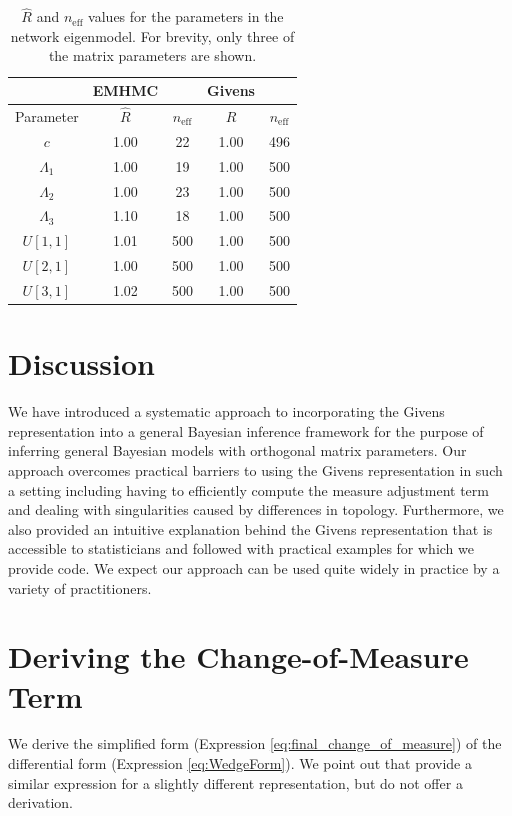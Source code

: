 \documentclass[ba]{imsart}
\numberwithin{equation}{section}
\theoremstyle{plain}
\begin{document}
\begin{table}
\begin{tabular}{|c||cc|cc|}
\hline
 & EMHMC & & Givens &\\
\hline
Parameter & $\hat{R}$ & $n_{\mathrm{eff}}$ & $\hat{R}$ & $n_{\mathrm{eff}}$\\
\hline
\hline
$c$ & 1.00 & 22 & 1.00 & 496\\
$\Lambda_1$ & 1.00 & 19 & 1.00 & 500\\
$\Lambda_2$ & 1.00 & 23 & 1.00 & 500\\
$\Lambda_3$ & 1.10 & 18 & 1.00 & 500\\
$U[1,1]$ & 1.01 & 500 & 1.00 & 500\\
$U[2,1]$ & 1.00 & 500 & 1.00 & 500\\
$U[3,1]$ & 1.02 & 500 & 1.00 & 500\\
\hline
\end{tabular}
\caption{$\hat{R}$ and $n_{\mathrm{eff}}$ values for the parameters in the network eigenmodel. For brevity, only three of the matrix parameters are shown.}
\label{tab:rhat_neff_eigennetwork}
\end{table}

\section{Discussion}\label{discussion}
We have introduced a systematic approach to incorporating the Givens representation into a general Bayesian inference framework for the purpose of inferring general Bayesian models with orthogonal matrix parameters. Our approach overcomes practical barriers to using the Givens representation in such a setting including having to efficiently compute the measure adjustment term and dealing with singularities caused by differences in topology. Furthermore, we also provided an intuitive explanation behind the Givens representation that is accessible to statisticians and followed with practical examples for which we provide code. We expect our approach can be used quite widely in practice by a variety of practitioners.

\appendix
\section{Deriving the Change-of-Measure Term}
We derive the simplified form (Expression \ref{eq:final_change_of_measure}) of the differential form (Expression \ref{eq:WedgeForm}). We point out that \cite{khatri1977mises} provide a similar expression for a slightly different representation, but do not offer a derivation.
\end{document}
